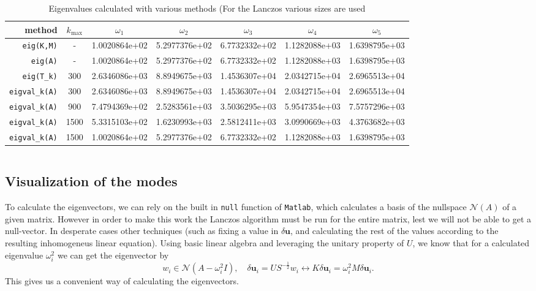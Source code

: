 \documentclass{article}
\newenvironment{code}{\captionsetup{type=listing}}{}
\begin{document}
\begin{table}[h!]
	\centering
	\caption{Eigenvalues calculated with various methods (For the Lanczos various sizes are used}\label{table:eig-calc-300}
	\begin{tabular}{r|c|c|c|c|c|c}
		method & $k_{\mathrm{max}}$ & $\omega_1$& $\omega_2$& $\omega_3$& $\omega_4$& $\omega_5$ \\\hline\hline
		\texttt{eig(K,M)} &-&  1.0020864e+02 & 5.2977376e+02 & 6.7732332e+02 & 1.1282088e+03 & 1.6398795e+03\\\hline
		\texttt{eig(A)} &-& 1.0020864e+02 & 5.2977376e+02 & 6.7732332e+02 & 1.1282088e+03 & 1.6398795e+03\\\hline\hline
		\texttt{eig(T\_k)} &300& 2.6346086e+03 & 8.8949675e+03 & 1.4536307e+04 & 2.0342715e+04 & 2.6965513e+04 \\\hline
		\texttt{eigval\_k(A)} &300& 2.6346086e+03 & 8.8949675e+03 & 1.4536307e+04 & 2.0342715e+04 & 2.6965513e+04\\\hline\hline
		\texttt{eigval\_k(A)} &900& 7.4794369e+02 & 2.5283561e+03 & 3.5036295e+03 & 5.9547354e+03 & 7.5757296e+03\\\hline\hline
		\texttt{eigval\_k(A)} &1500& 5.3315103e+02 & 1.6230993e+03 & 2.5812411e+03 & 3.0990669e+03 & 4.3763682e+03\\\hline\hline
		\texttt{eigval\_k(A)} &1500& 1.0020864e+02 & 5.2977376e+02 & 6.7732332e+02 & 1.1282088e+03 & 1.6398795e+03\\\hline\hline
	\end{tabular}
	 
	 
	
	
\end{table}
 
\FloatBarrier

\begin{code}
	\inputminted[mathescape,linenos,frame=lines]{matlab}{../tests/solve_afm.m}
	\label{code:solve-afm}
\end{code}
	
\subsection{Visualization of the modes}

To calculate the eigenvectors, we can rely on the built in \texttt{null} function of \texttt{Matlab}, which calculates a basis of the nullspace $\mathcal{N}(A)$ of a given matrix. However in order to make this work the Lanczos algorithm must be run for the entire matrix, lest we will not be able to get a null-vector. In desperate cases other techniques (such as fixing a value in $\delta\textbf{u}$, and calculating the rest of the values according to the resulting inhomogeneus linear equation). Using basic linear algebra and leveraging the unitary property of $U$, we know that for a calculated eigenvalue $\omega_i^2$ we can get the eigenvector by  
\begin{equation}
	w_i \in \mathcal{N}(A-\omega_i^2 I), \quad \delta \textbf{u}_i = U S^{-\frac{1}{2}} w_i  \leftrightarrow K \delta \textbf{u}_i = \omega_i^2 M \delta \textbf{u}_i. 
\end{equation}
This gives us a convenient way of calculating the eigenvectors.
\end{document}
